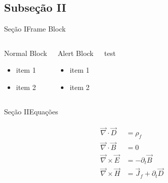 \documentclass[aspectratio=169]{beamer}
\begin{document}
\subsection{Subseção II}
\begin{slide}{Seção I}{Frame Block}
	\begin{columns}
		\begin{block}{Normal Block}
			\begin{itemize}[<+(1)->]
				\item item 1
				\item item 2
			\end{itemize}
		\end{block}
		\begin{alertblock}{Alert Block}
			\begin{itemize}[<+(1)->]
				\item  item 1
				\item  item 2
			\end{itemize}
		\end{alertblock}

		\begin{exampleblock}{test}
		\end{exampleblock}
	\end{columns}
\end{slide}

\begin{slide}{Seção II}{Equações}
	\centering

	\begin{exampleblock}{}
		\begin{align*}
			\begin{split}
				\vec{\nabla}\cdot\vec{D} &= \rho_{f} \\
				\vec{\nabla}\cdot\vec{B} &= 0	\\
				\vec{\nabla}\times \vec{E} &= -\partial_t \vec{B}\\
				\vec{\nabla}\times \vec{H} &= \vec{J}_{f}+\partial_t \vec{D}
			\end{split}
		\end{align*}	
	\end{exampleblock}
\end{slide}
\end{document}

